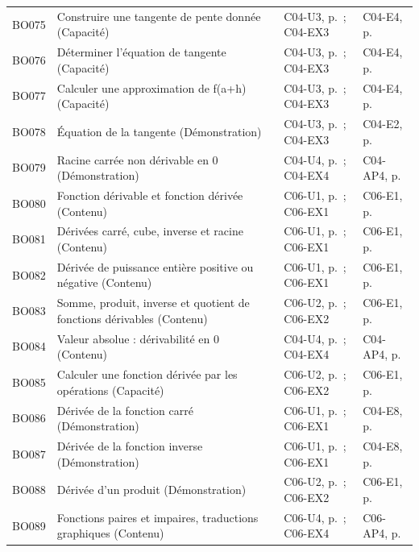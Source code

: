 \begin{longtable}{p{.1\linewidth}p{.43\linewidth}p{.19\linewidth}p{.16\linewidth}}
BO075 & Construire une tangente de pente donnée (Capacité) & C04-U3, p.\,\pageref{C04-U3} ; C04-EX3 & C04-E4, p.\,\pageref{C04-E4} \\
BO076 & Déterminer l’équation de tangente (Capacité) & C04-U3, p.\,\pageref{C04-U3} ; C04-EX3 & C04-E4, p.\,\pageref{C04-E4} \\
BO077 & Calculer une approximation de f(a+h) (Capacité) & C04-U3, p.\,\pageref{C04-U3} ; C04-EX3 & C04-E4, p.\,\pageref{C04-E4} \\
BO078 & Équation de la tangente (Démonstration) & C04-U3, p.\,\pageref{C04-U3} ; C04-EX3 & C04-E2, p.\,\pageref{C04-E2} \\
BO079 & Racine carrée non dérivable en 0 (Démonstration) & C04-U4, p.\,\pageref{C04-U4} ; C04-EX4 & C04-AP4, p.\,\pageref{C04-AP4} \\
BO080 & Fonction dérivable et fonction dérivée (Contenu) & C06-U1, p.\,\pageref{C06-U1} ; C06-EX1 & C06-E1, p.\,\pageref{C06-E1} \\
BO081 & Dérivées carré, cube, inverse et racine (Contenu) & C06-U1, p.\,\pageref{C06-U1} ; C06-EX1 & C06-E1, p.\,\pageref{C06-E1} \\
BO082 & Dérivée de puissance entière positive ou négative (Contenu) & C06-U1, p.\,\pageref{C06-U1} ; C06-EX1 & C06-E1, p.\,\pageref{C06-E1} \\
BO083 & Somme, produit, inverse et quotient de fonctions dérivables (Contenu) & C06-U2, p.\,\pageref{C06-U2} ; C06-EX2 & C06-E1, p.\,\pageref{C06-E1} \\
BO084 & Valeur absolue : dérivabilité en 0 (Contenu) & C04-U4, p.\,\pageref{C04-U4} ; C04-EX4 & C04-AP4, p.\,\pageref{C04-AP4} \\
BO085 & Calculer une fonction dérivée par les opérations (Capacité) & C06-U2, p.\,\pageref{C06-U2} ; C06-EX2 & C06-E1, p.\,\pageref{C06-E1} \\
BO086 & Dérivée de la fonction carré (Démonstration) & C06-U1, p.\,\pageref{C06-U1} ; C06-EX1 & C04-E8, p.\,\pageref{C04-E8} \\
BO087 & Dérivée de la fonction inverse (Démonstration) & C06-U1, p.\,\pageref{C06-U1} ; C06-EX1 & C04-E8, p.\,\pageref{C04-E8} \\
BO088 & Dérivée d’un produit (Démonstration) & C06-U2, p.\,\pageref{C06-U2} ; C06-EX2 & C06-E1, p.\,\pageref{C06-E1} \\
BO089 & Fonctions paires et impaires, traductions graphiques (Contenu) & C06-U4, p.\,\pageref{C06-U4} ; C06-EX4 & C06-AP4, p.\,\pageref{C06-AP4} \\

\end{longtable}
